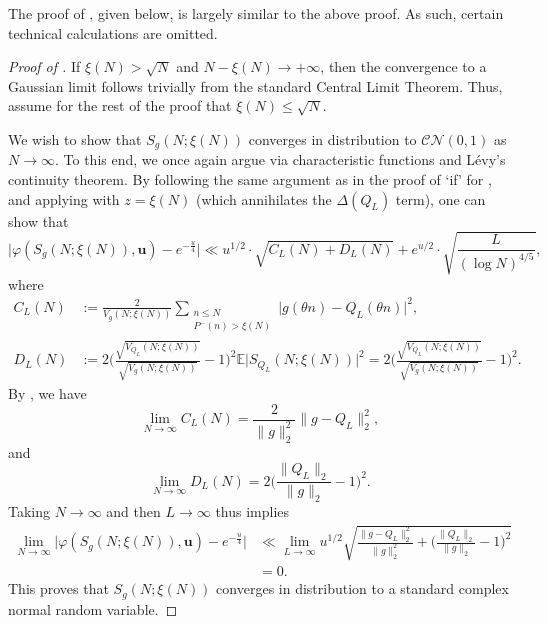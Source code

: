 \documentclass[12pt]{amsart}
\renewcommand{\le}{\leqslant}
\renewcommand{\leq}{\leqslant}
\numberwithin{equation}{section}
\theoremstyle{plain}
\theoremstyle{definition}
\newcommand{\E}{\mathbb{E}}
\newcommand{\CC}{\mathcal{C}}
\newcommand{\CN}{\mathcal{N}}
\renewcommand{\phi}{\varphi}
\begin{document}
	The proof of , given below, is largely similar to the above proof. As such, certain technical calculations are omitted. 
	\begin{proof}[Proof of ]
		If $\xi(N) > \sqrt{N}$ and $N - \xi(N) \to +\infty$, then the convergence to a Gaussian limit follows trivially from the standard Central Limit Theorem. Thus, assume for the rest of the proof that $\xi(N) \le \sqrt{N}$. 
		
		We wish to show that $S_{g}(N;\xi(N))$ converges in distribution to $\CC\CN(0,1)$ as $N \to \infty$. To this end, we once again argue via characteristic functions and L\'evy's continuity theorem. By following the same argument as in the proof of `if' for , and applying  with $z=\xi(N)$ (which annihilates the $\Delta(Q_L)$ term), one can show that
		\begin{equation*}
			\big|\phi(S_{g}(N;\xi(N)),\bm{u})-e^{-\frac{u}{4}}\big| \ll u^{1/2} \cdot \sqrt{C_L(N) + D_L(N)}+ e^{u/2}\cdot \sqrt{\frac{L}{(\log N)^{4/5}}},
		\end{equation*}
		where
		\begin{align*}
			C_L(N) &:= \frac{2}{V_{g}(N;\xi(N))} \sum_{\substack{n \leq N \\ P^-(n) > \xi(N)}}  \Big|g(\theta n)-Q_L(\theta n)\Big|^2,\\
			D_L(N) &:=  2\bigg(\frac{\sqrt{V_{Q_L}(N;\xi(N))}}{\sqrt{V_{g}(N;\xi(N))}} - 1\bigg)^2 \E \big|S_{Q_L}(N;\xi(N))\big|^2 = 2\bigg(\frac{\sqrt{V_{Q_L}(N;\xi(N))}}{\sqrt{V_{g}(N;\xi(N))}} - 1\bigg)^2.
		\end{align*}
		By , we have
		$$\lim_{N \to \infty} C_L(N) = \frac{2}{\|g\|_2^2} \|g-Q_L\|_{2}^2,$$
		and $$\lim_{N \to \infty} D_L(N) =  2\bigg(\frac{\|Q_L\|_2}{\|g\|_2} - 1\bigg)^2.$$
		Taking $N \to \infty$ and then $L \to \infty$ thus implies
		\begin{align*}
			\lim_{N\to \infty}\big|\phi(S_{g}(N;\xi(N)),\bm{u})-e^{-\frac{u}{4}}\big| &\ll \lim_{L \to \infty} u^{1/2}\sqrt{\frac{\|g-Q_L\|_{2}^2}{\|g\|_2^2}  +\bigg(\frac{\|Q_L\|_2}{\|g\|_2} - 1\bigg)^2} \\ &= 0.
		\end{align*}
		This proves that $S_{g}(N;\xi(N))$ converges in distribution to a standard complex normal random variable.
		
	\end{proof}
	
	
	
\end{document}
